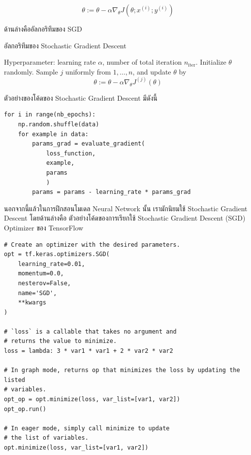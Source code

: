 \begin{equation}\label{eq:sgd}
    \theta := \theta - \alpha\nabla_\theta J( \theta; x^{(i)}; y^{(i)})
\end{equation}

\noindent ด้านล่างคืออัลกอริทึมของ SGD

\begin{algorithm}[H]
    \caption{อัลกอริทึมของ Stochastic Gradient Descent}
    \label{alg:sgd}
    \begin{algorithmic}
    \State Hyperparameter: learning rate $\alpha$, number of total iteration $n_\text{iter}$.
    \State Initialize $\theta$ randomly.
        \State Sample $j$ uniformly from ${1,\ldots,n}$, and update $\theta$ by
        \begin{equation*}
            \theta := \theta - \alpha\nabla_\theta J^{(j)}(\theta)
        \end{equation*}
    \EndFor
    \end{algorithmic}
\end{algorithm}

\noindent ตัวอย่างของโค้ดของ Stochastic Gradient Descent มีดังนี้

\begin{lstlisting}[style=MyPython]
for i in range(nb_epochs):
    np.random.shuffle(data)
    for example in data:
        params_grad = evaluate_gradient(
            loss_function, 
            example, 
            params
            )
        params = params - learning_rate * params_grad
\end{lstlisting}

\vspace{1em}
\noindent นอกจากนี้แล้วในการฝึกสอนโมเดล Neural Network นั้น เรามักนิยมใช้ Stochastic Gradient Descent โดยด้านล่างคือ%
ตัวอย่างโค้ดของการเรียกใช้ Stochastic Gradient Descent (SGD) Optimizer ของ TensorFlow

\begin{lstlisting}[style=MyPython]
# Create an optimizer with the desired parameters.
opt = tf.keras.optimizers.SGD(
    learning_rate=0.01,
    momentum=0.0,
    nesterov=False,
    name='SGD',
    **kwargs
)

# `loss` is a callable that takes no argument and 
# returns the value to minimize.
loss = lambda: 3 * var1 * var1 + 2 * var2 * var2

# In graph mode, returns op that minimizes the loss by updating the listed
# variables.
opt_op = opt.minimize(loss, var_list=[var1, var2])
opt_op.run()

# In eager mode, simply call minimize to update 
# the list of variables.
opt.minimize(loss, var_list=[var1, var2])
\end{lstlisting}

